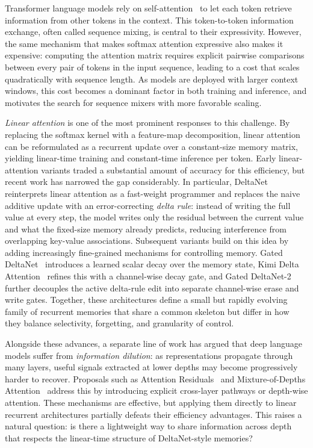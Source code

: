 \documentclass{article}
\begin{document}
Transformer language models rely on self-attention~\cite{vaswani2017attention} to let each token retrieve information from other tokens in the context. This token-to-token information exchange, often called sequence mixing, is central to their expressivity. However, the same mechanism that makes softmax attention expressive also makes it expensive: computing the attention matrix requires explicit pairwise comparisons between every pair of tokens in the input sequence, leading to a cost that scales quadratically with sequence length. As models are deployed with larger context windows, this cost becomes a dominant factor in both training and inference, and motivates the search for sequence mixers with more favorable scaling.

\emph{Linear attention} is one of the most prominent responses to this challenge. By replacing the softmax kernel with a feature-map decomposition, linear attention can be reformulated as a recurrent update over a constant-size memory matrix, yielding linear-time training and constant-time inference per token. Early linear-attention variants traded a substantial amount of accuracy for this efficiency, but recent work has narrowed the gap considerably. In particular, DeltaNet~\cite{schlag2021linear} reinterprets linear attention as a fast-weight programmer and replaces the naive additive update with an error-correcting \emph{delta rule}: instead of writing the full value at every step, the model writes only the residual between the current value and what the fixed-size memory already predicts, reducing interference from overlapping key-value associations. Subsequent variants build on this idea by adding increasingly fine-grained mechanisms for controlling memory. Gated DeltaNet~\cite{yang2024gdn} introduces a learned scalar decay over the memory state, Kimi Delta Attention~\cite{kimi2025linear} refines this with a channel-wise decay gate, and Gated DeltaNet-2~\cite{hatamizadeh2026gdn2} further decouples the active delta-rule edit into separate channel-wise erase and write gates. Together, these architectures define a small but rapidly evolving family of recurrent memories that share a common skeleton but differ in how they balance selectivity, forgetting, and granularity of control.

Alongside these advances, a separate line of work has argued that deep language models suffer from \emph{information dilution}: as representations propagate through many layers, useful signals extracted at lower depths may become progressively harder to recover. Proposals such as Attention Residuals~\cite{attention_residuals} and Mixture-of-Depths Attention~\cite{mixture_of_depths_attention} address this by introducing explicit cross-layer pathways or depth-wise attention. These mechanisms are effective, but applying them directly to linear recurrent architectures partially defeats their efficiency advantages. This raises a natural question: is there a lightweight way to share information across depth that respects the linear-time structure of DeltaNet-style memories?
\end{document}
